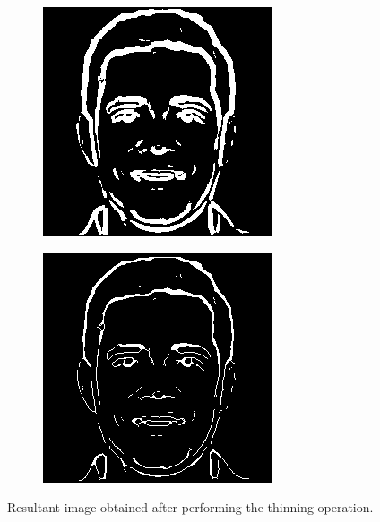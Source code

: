 \documentclass{70_styles/svproc}
\begin{document}
\begin{figure}
     \centering
     \begin{subfigure}[b]{0.2\textwidth}
         \centering
         \includegraphics[width=\textwidth]{70_figures/com-seed1830.png}
     \end{subfigure}
     \begin{subfigure}[b]{0.2\textwidth}
         \centering
         \includegraphics[width=\textwidth]{70_figures/thinned-seed1830.png}
     \end{subfigure}
     \caption{Resultant image obtained after performing the thinning operation.}
\end{figure}
\end{document}
